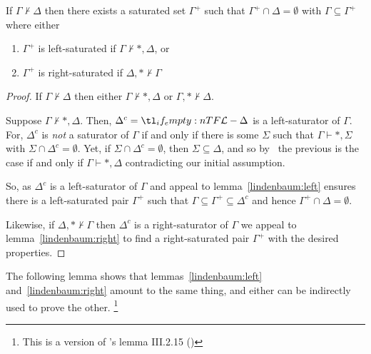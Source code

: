 \documentclass[10pt]{article}
\begin{document}
\begin{corollary}[Saturation]
  If \(\Gamma \nvdash \Delta\) then there exists a saturated set \(\Gamma^{+}\) such that \(\Gamma^{+} \cap \Delta = \emptyset\) with \(\Gamma \subseteq \Gamma^{+}\) where either
  \begin{enumerate}
  \item \(\Gamma^{+}\) is left-saturated if \(\Gamma \nvdash \ast, \Delta\), or
  \item \(\Gamma^{+}\) is right-saturated if \(\Delta,\ast \nvdash \Gamma\)
  \end{enumerate}
  \begin{proof}
    If \(\Gamma \nvdash \Delta\) then either \(\Gamma \nvdash \ast, \Delta\) or \(\Gamma, \ast \nvdash \Delta\).

    Suppose \(\Gamma \nvdash \ast, \Delta\).
    Then, \(\Delta^{c} = \olang{} - \Delta\) is a left-saturator of \(\Gamma\).
    For, \(\Delta^{c}\) is \emph{not} a saturator of \(\Gamma\) if and only if there is some \(\Sigma\) such that \(\Gamma \vdash \ast, \Sigma\) with \(\Sigma \cap \Delta^{c} = \emptyset\).
    Yet, if \(\Sigma \cap \Delta^{c} = \emptyset\), then \(\Sigma \subseteq \Delta\), and so by \ the previous is the case if and only if \(\Gamma \vdash \ast, \Delta\) contradicting our initial assumption.

    So, as \(\Delta^{c}\) is a left-saturator of \(\Gamma\) and appeal to lemma~\ref{lindenbaum:left} ensures there is a left-saturated pair \(\Gamma^{+}\) such that \(\Gamma \subseteq \Gamma^{+} \subseteq \Delta^{c}\) and hence \(\Gamma^{+} \cap \Delta = \emptyset\).

    Likewise, if \(\Delta, \ast \nvdash \Gamma\) then \(\Delta^{c}\) is a right-saturator of \(\Gamma\) we appeal to lemma~\ref{lindenbaum:right} to find a right-saturated pair \(\Gamma^{+}\) with the desired properties.
  \end{proof}
\end{corollary}

The following lemma shows that lemmas~\ref{lindenbaum:left} and~\ref{lindenbaum:right} amount to the same thing, and either can be indirectly used to prove the other.\nolinebreak
\footnote{This is a version of \citeauthor{Blamey:1980aa}'s lemma III.2.15 (\citeyear[122]{Blamey:1980aa})}
\end{document}

